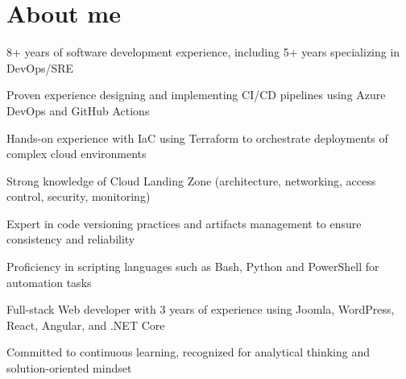 \documentclass[]{deedy-resume-openfont}
\begin{document}
    
%
%
%
%
\sectionsep
\sectionsep
\section{About me}
\vspace{5pt}
\begin{tightemize}
	\item 8+ years of software development experience, including 5+ years specializing in DevOps/SRE
	\item Proven experience designing and implementing CI/CD pipelines using Azure DevOps and GitHub Actions
	\item Hands-on experience with IaC using Terraform to orchestrate deployments of complex cloud environments
	\item Strong knowledge of Cloud Landing Zone (architecture, networking, access control, security, monitoring)
	\item Expert in code versioning practices and artifacts management to ensure consistency and reliability
	\item Proficiency in scripting languages such as Bash, Python and PowerShell for automation tasks
	\item Full-stack Web developer with 3 years of experience using Joomla, WordPress, React, Angular, and .NET Core
	\item Committed to continuous learning, recognized for analytical thinking and solution-oriented mindset
\end{tightemize}
%
%
\end{document}
